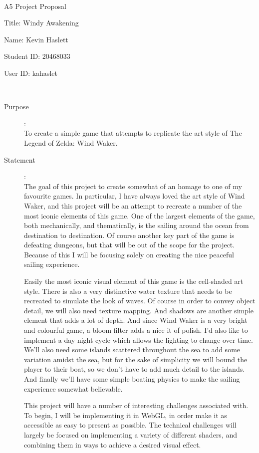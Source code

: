 \documentclass {article}
\begin{document}
~\vfill
\begin{center}
\Large

A5 Project Proposal

Title: Windy Awakening

Name: Kevin Haslett

Student ID: 20468033

User ID: kahaslet
\end{center}
\vfill ~\vfill~
\newpage
{}
\begin{description}
\item[Purpose]:\\
	To create a simple game that attempts to replicate the art style of The Legend of Zelda: Wind Waker.

\item[Statement]:\\

The goal of this project to create somewhat of an homage to one of my favourite games.  In particular, I have always loved the art style of Wind Waker, and this project will be an attempt to recreate a number of the most iconic elements of this game.  One of the largest elements of the game, both mechanically, and thematically, is the sailing around the ocean from destination to destination.  Of course another key part of the game is defeating dungeons, but that will be out of the scope for the project.  Because of this I will be focusing solely on creating the nice peaceful sailing experience.

Easily the most iconic visual element of this game is the cell-shaded art style. There is also a very distinctive water texture that needs to be recreated to simulate the look of waves.  Of course in order to convey object detail, we will also need texture mapping.  And shadows are another simple element that adds a lot of depth.  And since Wind Waker is a very bright and colourful game, a bloom filter adds a nice it of polish.  I'd also like to implement a day-night cycle which allows the lighting to change over time.  We'll also need some islands scattered throughout the sea to add some variation amidst the sea, but for the sake of simplicity we will bound the player to their boat, so we don't have to add much detail to the islands.  And finally we'll have some simple boating physics to make the sailing experience somewhat believable.

This project will have a number of interesting challenges associated with.  To begin, I will be implementing it in WebGL, in order make it as accessible as easy to present as possible.  The technical challenges will largely be focused on implementing a variety of different shaders, and combining them in ways to achieve a desired visual effect.


\end{description}
\end{document}
